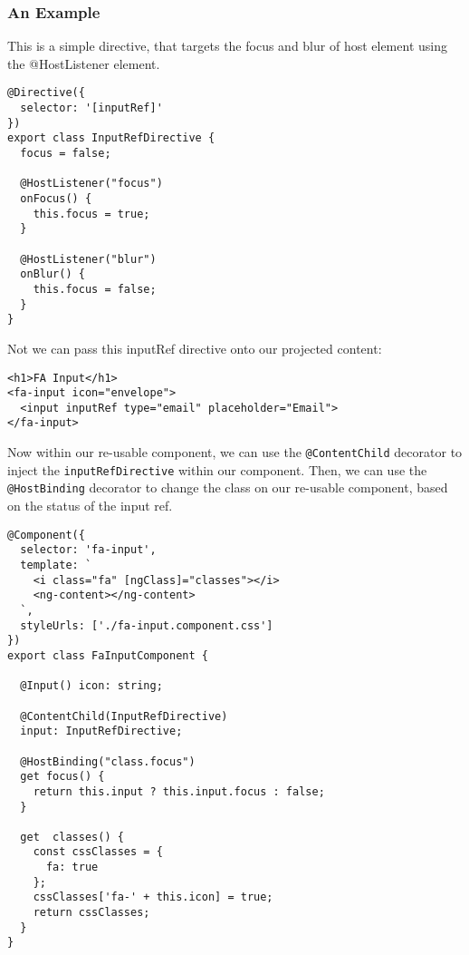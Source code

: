 \subsubsection{ An Example }
This is a simple directive, that targets the focus and blur of host element
using the @HostListener element.

\begin{lstlisting}
@Directive({
  selector: '[inputRef]'
})
export class InputRefDirective {
  focus = false;

  @HostListener("focus")
  onFocus() {
    this.focus = true;
  }

  @HostListener("blur")
  onBlur() {
    this.focus = false;
  }
}
\end{lstlisting}

Not we can pass this inputRef directive onto our projected content:
\begin{lstlisting}
<h1>FA Input</h1>
<fa-input icon="envelope">
  <input inputRef type="email" placeholder="Email">
</fa-input>
\end{lstlisting}

Now within our re-usable component, we can use the \texttt{@ContentChild}
decorator to inject the \texttt{inputRefDirective} within our component. Then,
we can use the \texttt{@HostBinding} decorator to change the class on our
re-usable component, based on the status of the input ref.
\begin{lstlisting}
@Component({
  selector: 'fa-input',
  template: `
    <i class="fa" [ngClass]="classes"></i>
    <ng-content></ng-content>
  `,
  styleUrls: ['./fa-input.component.css']
})
export class FaInputComponent {

  @Input() icon: string;

  @ContentChild(InputRefDirective)
  input: InputRefDirective;

  @HostBinding("class.focus")
  get focus() {
    return this.input ? this.input.focus : false;
  }

  get  classes() {
    const cssClasses = {
      fa: true
    };
    cssClasses['fa-' + this.icon] = true;
    return cssClasses;
  }
}
\end{lstlisting}
